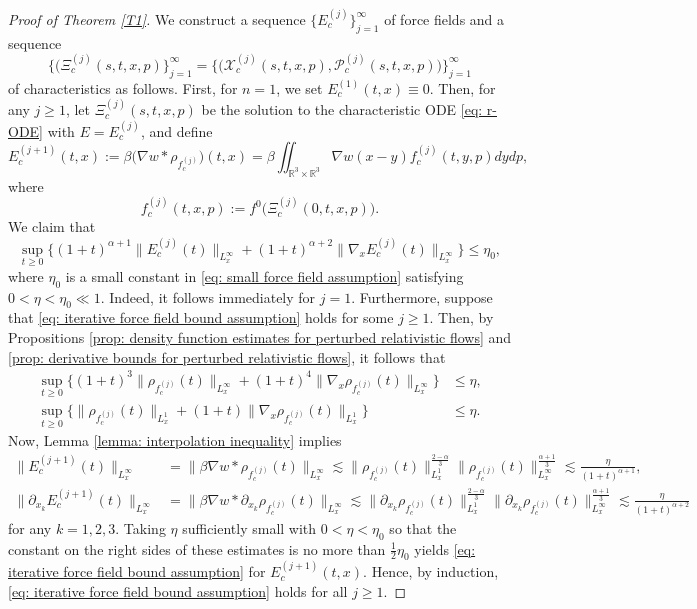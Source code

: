 \documentclass[reqno, 11pt, letterpaper]{amsart}
\theoremstyle{remark}
\numberwithin{equation}{section}
\numberwithin{theorem}{section}
\numberwithin{table}{section}
\numberwithin{figure}{section}
\begin{document}
\begin{proof}[Proof of Theorem \ref{T1}]
We construct a sequence $\{E_c^{(j)}\}_{j=1}^\infty$ of force fields and a sequence
$$\big\{(\Xi_c^{(j)}(s,t, x,p)\big\}_{j=1}^\infty=\big\{\big(\mathcal{X}_c^{(j)}(s,t, x,p), \mathcal{P}_c^{(j)}(s,t, x,p)\big)\big\}_{j=1}^\infty$$
of characteristics as follows. First, for $n=1$, we set $E_c^{(1)}(t,x)\equiv0$.  Then, for any $j\geq1$, let $\Xi_c^{(j)}(s,t, x,p)$ be the solution to the characteristic ODE \eqref{eq: r-ODE} with $E=E_c^{(j)}$, and define
 $$E_c^{(j+1)}(t,x):=\beta \big(\nabla w*\rho_{f_c^{(j)}}\big)(t,x)=\beta\iint_{\mathbb{R}^3\times\mathbb{R}^3}\nabla w(x-y)f_c^{(j)}(t,y,p)dydp,$$
 where
 $$f_c^{(j)}(t,x,p):=f^0\big(\Xi_c^{(j)}(0,t, x,p)\big).$$
 We claim that
\begin{equation}\label{eq: iterative force field bound assumption}
\sup_{t\geq0}\Big\{(1+t)^{\alpha+1}\|E_c^{(j)}(t)\|_{L_x^\infty}+(1+t)^{\alpha+2}\|\nabla_x E_c^{(j)}(t)\|_{L_x^\infty}\Big\}\leq\eta_0,
\end{equation}
where $\eta_0$ is a small constant in \eqref{eq: small force field assumption} satisfying $0 < \eta < \eta_0 \ll 1$. Indeed, it follows immediately for $j=1$. Furthermore, suppose that \eqref{eq: iterative force field bound assumption} holds for some $j\geq 1$. Then, by Propositions \ref{prop: density function estimates for perturbed relativistic flows} and \ref{prop: derivative bounds for perturbed relativistic flows}, it follows that 
$$\begin{aligned}
\sup_{t\geq0}\Big\{(1+t)^3\|\rho_{f_c^{(j)}}(t)\|_{L_x^\infty}+(1+t)^4\|\nabla_x \rho_{f_c^{(j)}}(t)\|_{L_x^\infty}\Big\} &\leq\eta,\\
\sup_{t\geq0}\Big\{\|\rho_{f_c^{(j)}}(t)\|_{L_x^1}+(1+t)\|\nabla_x \rho_{f_c^{(j)}}(t)\|_{L_x^1}\Big\} &\leq\eta.
\end{aligned}$$
%
Now, Lemma \ref{lemma: interpolation inequality} implies
$$\begin{aligned}
\|E_c^{(j+1)}(t)\|_{L_x^\infty}&= \|\beta\nabla w*\rho_{f_c^{(j)}}(t)\|_{L_x^\infty}\lesssim \|\rho_{f_c^{(j)}}(t)\|_{L_x^1}^{\frac{2-\alpha}{3}}\|\rho_{f_c^{(j)}}(t)\|_{L_x^\infty}^{\frac{\alpha+1}{3}}\lesssim\frac{\eta}{(1+t)^{\alpha+1}},\\
\|\partial_{x_k} E_c^{(j+1)}(t)\|_{L_x^\infty}&= \|\beta\nabla w*\partial_{x_k}\rho_{f_c^{(j)}}(t)\|_{L_x^\infty}\lesssim \|\partial_{x_k}\rho_{f_c^{(j)}}(t)\|_{L_x^1}^{\frac{2-\alpha}{3}}\|\partial_{x_k}\rho_{f_c^{(j)}}(t)\|_{L_x^\infty}^{\frac{\alpha+1}{3}}\lesssim\frac{\eta}{(1+t)^{\alpha+2}}
\end{aligned}$$
for any $k=1, 2, 3$.
Taking $\eta$ sufficiently small with $0 < \eta < \eta_0$ so that the constant on the right sides of these estimates is no more than $\frac{1}{2}\eta_0$ yields \eqref{eq: iterative force field bound assumption} for $E_c^{(j+1)}(t,x)$.
Hence, by induction, \eqref{eq: iterative force field bound assumption} holds for all $j \geq 1$.


\end{proof}
\end{document}
